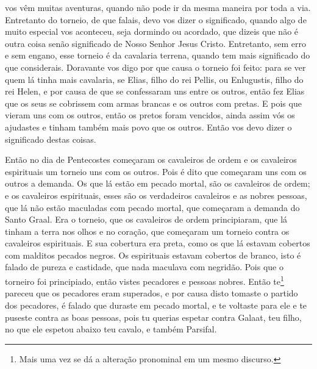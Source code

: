 vos vêm muitas aventuras, quando não pode ir da mesma maneira por toda a via.
Entretanto do torneio, de que falais, devo vos dizer o significado, quando algo
de  muito especial vos aconteceu, seja dormindo ou acordado, que dizeis que não
é outra coisa senão significado de Nosso Senhor Jesus Cristo. Entretanto, sem
erro e sem engano, esse torneio é da cavalaria terrena, quando tem mais
significado do que considerais. Doravante vos digo por que causa o torneio foi
feito: para se ver quem lá tinha mais cavalaria, se Elias, filho do rei Pellis,
ou Enlugustis, filho do rei Helen, e por causa de que se confessaram uns entre
os outros, então fez Elias que os seus se cobrissem com armas brancas e os
outros com pretas. E pois que vieram uns com os outros, então os pretos foram
vencidos, ainda assim vós os ajudastes e tinham também mais povo que os outros.
Então vos devo dizer o significado destas coisas.

Então no dia de Pentecostes começaram os cavaleiros de ordem e os cavaleiros
espirituais um torneio uns com os outros. Pois é dito que começaram uns com os
outros a demanda. Os que lá estão em pecado mortal, são os cavaleiros de ordem;
e os cavaleiros espirituais, esses são os verdadeiros cavaleiros e as nobres
pessoas, que lá não estão maculadas com pecado mortal, que começaram a demanda
do Santo Graal. Era o torneio, que os cavaleiros de ordem principiaram, que lá
tinham a terra nos olhos e no coração, que começaram um torneio contra os
cavaleiros espirituais. E sua cobertura era preta, como os que lá estavam
cobertos com malditos pecados negros. Os espirituais estavam cobertos de
branco, isto é falado de pureza e castidade, que nada maculava com negridão.
Pois que o torneiro foi principiado, então vistes pecadores e pessoas nobres.
Então te\footnote{ Mais uma vez se dá a alteração pronominal em um mesmo
discurso.}  pareceu que os pecadores eram superados, e por causa
disto tomaste o partido dos pecadores, é falado que duraste em pecado mortal, e
te voltaste para ele e te puseste contra as boas pessoas, pois tu querias
espetar contra Galaat, teu filho, no que ele espetou abaixo teu cavalo, e
também Parsifal. 

